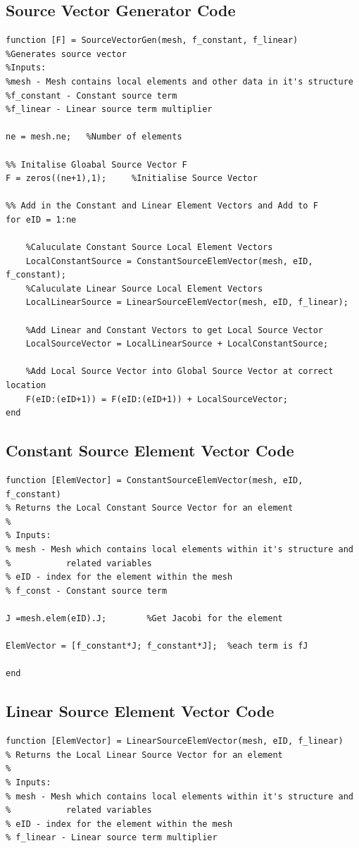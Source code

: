 \documentclass[11pt]{article}
\begin{document}
\begin{appendices}
\section{Source Vector Generator Code} \label{ap:SVG}
\begin{lstlisting}
function [F] = SourceVectorGen(mesh, f_constant, f_linear)
%Generates source vector
%Inputs:
%mesh - Mesh contains local elements and other data in it's structure
%f_constant - Constant source term
%f_linear - Linear source term multiplier

ne = mesh.ne;   %Number of elements

%% Initalise Gloabal Source Vector F
F = zeros((ne+1),1);     %Initialise Source Vector

%% Add in the Constant and Linear Element Vectors and Add to F
for eID = 1:ne
    
    %Caluculate Constant Source Local Element Vectors
    LocalConstantSource = ConstantSourceElemVector(mesh, eID, f_constant);
    %Caluculate Linear Source Local Element Vectors
    LocalLinearSource = LinearSourceElemVector(mesh, eID, f_linear);
    
    %Add Linear and Constant Vectors to get Local Source Vector
    LocalSourceVector = LocalLinearSource + LocalConstantSource;
    
    %Add Local Source Vector into Global Source Vector at correct location
    F(eID:(eID+1)) = F(eID:(eID+1)) + LocalSourceVector;
end
\end{lstlisting}

\subsection{Constant Source Element Vector Code}\label{ap:CSV}
\begin{lstlisting}
function [ElemVector] = ConstantSourceElemVector(mesh, eID, f_constant)
% Returns the Local Constant Source Vector for an element
%
% Inputs:
% mesh - Mesh which contains local elements within it's structure and
%           related variables
% eID - index for the element within the mesh
% f_const - Constant source term 

J =mesh.elem(eID).J;        %Get Jacobi for the element

ElemVector = [f_constant*J; f_constant*J];  %each term is fJ

end
\end{lstlisting}
\clearpage

\subsection{Linear Source Element Vector Code}\label{ap:LSV}
\begin{lstlisting}
function [ElemVector] = LinearSourceElemVector(mesh, eID, f_linear)
% Returns the Local Linear Source Vector for an element
%
% Inputs:
% mesh - Mesh which contains local elements within it's structure and
%           related variables
% eID - index for the element within the mesh
% f_linear - Linear source term multiplier


\end{lstlisting}
\end{appendices}
\end{document}
